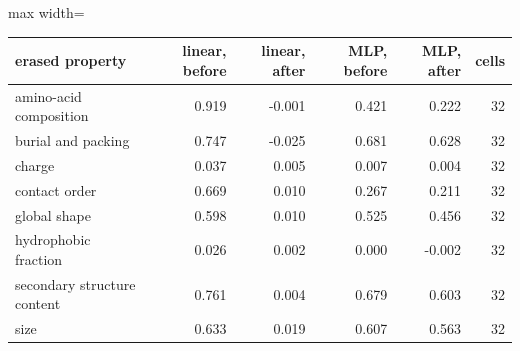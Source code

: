 \begin{adjustbox}{max width=\linewidth}
\begin{tabular}{lrrrrr}
\toprule
\rowcolor{CompassLavender!32}
erased property & linear, before & linear, after & MLP, before & MLP, after & cells \\
\midrule
amino-acid composition & 0.919 & -0.001 & 0.421 & 0.222 & 32 \\
burial and packing & 0.747 & -0.025 & 0.681 & 0.628 & 32 \\
charge & 0.037 & 0.005 & 0.007 & 0.004 & 32 \\
contact order & 0.669 & 0.010 & 0.267 & 0.211 & 32 \\
global shape & 0.598 & 0.010 & 0.525 & 0.456 & 32 \\
hydrophobic fraction & 0.026 & 0.002 & 0.000 & -0.002 & 32 \\
secondary structure content & 0.761 & 0.004 & 0.679 & 0.603 & 32 \\
size & 0.633 & 0.019 & 0.607 & 0.563 & 32 \\
\bottomrule
\end{tabular}
\end{adjustbox}
